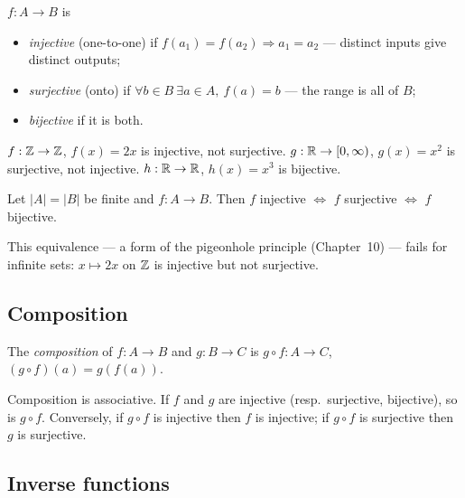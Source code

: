 \begin{definition}
$f : A \to B$ is
\begin{itemize}
\item \emph{injective} (one-to-one) if $f(a_1) = f(a_2) \Rightarrow
  a_1 = a_2$ --- distinct inputs give distinct outputs;
\item \emph{surjective} (onto) if $\forall b \in B\ \exists a \in A,\
  f(a) = b$ --- the range is all of $B$;
\item \emph{bijective} if it is both.
\end{itemize}
\end{definition}

\begin{example}
$f : \mathbb{Z} \to \mathbb{Z}$, $f(x) = 2x$ is injective, not surjective.
$g : \mathbb{R} \to [0,\infty)$, $g(x) = x^2$ is surjective, not injective.
$h : \mathbb{R} \to \mathbb{R}$, $h(x) = x^3$ is bijective.
\end{example}

\begin{theorem}\label{thm:finite}
Let $|A| = |B|$ be finite and $f : A \to B$. Then
$f$ injective $\iff$ $f$ surjective $\iff$ $f$ bijective.
\end{theorem}

This equivalence --- a form of the pigeonhole principle (Chapter~10) ---
fails for infinite sets: $x \mapsto 2x$ on $\mathbb{Z}$ is injective but not
surjective.

\subsection{Composition}

\begin{definition}
The \emph{composition} of $f : A \to B$ and $g : B \to C$ is
$g \circ f : A \to C$, $(g \circ f)(a) = g(f(a))$.
\end{definition}

\begin{theorem}\label{thm:comp}
Composition is associative. If $f$ and $g$ are injective (resp.\ surjective,
bijective), so is $g \circ f$. Conversely, if $g \circ f$ is injective then
$f$ is injective; if $g \circ f$ is surjective then $g$ is surjective.
\end{theorem}

\subsection{Inverse functions}

